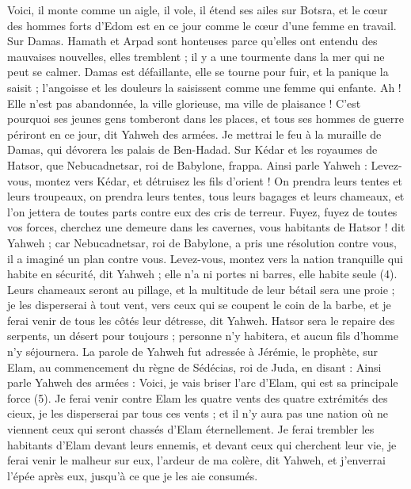 \begin{multicols}{2}
Voici, il monte comme un aigle, il vole, il étend ses ailes sur Botsra, et le cœur des hommes forts d'Edom est en ce jour comme le cœur d'une femme en travail.
Sur Damas. Hamath et Arpad sont honteuses parce qu'elles ont entendu des mauvaises nouvelles, elles tremblent ; il y a une tourmente dans la mer qui ne peut se calmer.
Damas est défaillante, elle se tourne pour fuir, et la panique la saisit ; l'angoisse et les douleurs la saisissent comme une femme qui enfante.
Ah ! Elle n'est pas abandonnée, la ville glorieuse, ma ville de plaisance !
C'est pourquoi ses jeunes gens tomberont dans les places, et tous ses hommes de guerre périront en ce jour, dit Yahweh des armées.
Je mettrai le feu à la muraille de Damas, qui dévorera les palais de Ben-Hadad.
Sur Kédar et les royaumes de Hatsor, que Nebucadnetsar, roi de Babylone, frappa. Ainsi parle Yahweh : Levez-vous, montez vers Kédar, et détruisez les fils d'orient !
On prendra leurs tentes et leurs troupeaux, on prendra leurs tentes, tous leurs bagages et leurs chameaux, et l'on jettera de toutes parts contre eux des cris de terreur.
Fuyez, fuyez de toutes vos forces, cherchez une demeure dans les cavernes, vous habitants de Hatsor ! dit Yahweh ; car Nebucadnetsar, roi de Babylone, a pris une résolution contre vous, il a imaginé un plan contre vous.
Levez-vous, montez vers la nation tranquille qui habite en sécurité, dit Yahweh ; elle n'a ni portes ni barres, elle habite seule\FTNT{} (4).
Leurs chameaux seront au pillage, et la multitude de leur bétail sera une proie ; je les disperserai à tout vent, vers ceux qui se coupent le coin de la barbe, et je ferai venir de tous les côtés leur détresse, dit Yahweh.
Hatsor sera le repaire des serpents, un désert pour toujours ; personne n’y habitera, et aucun fils d'homme n'y séjournera.
La parole de Yahweh fut adressée à Jérémie, le prophète, sur Elam, au commencement du règne de Sédécias, roi de Juda, en disant :
Ainsi parle Yahweh des armées : Voici, je vais briser l'arc d'Elam, qui est sa principale force\FTNT{} (5).
Je ferai venir contre Elam les quatre vents des quatre extrémités des cieux, je les disperserai par tous ces vents ; et il n'y aura pas une nation où ne viennent ceux qui seront chassés d'Elam éternellement.
Je ferai trembler les habitants d'Elam devant leurs ennemis, et devant ceux qui cherchent leur vie, je ferai venir le malheur sur eux, l'ardeur de ma colère, dit Yahweh, et j'enverrai l'épée après eux, jusqu’à ce que je les aie consumés.

\end{multicols}
